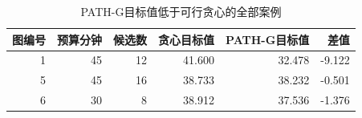 \begin{table}[htbp]\centering\caption{PATH-G目标值低于可行贪心的全部案例}\begin{tabular}{rrrrrr}\toprule 图编号&预算分钟&候选数&贪心目标值&PATH-G目标值&差值\\\midrule
1&45&12&41.600&32.478&-9.122\\
5&45&16&38.733&38.232&-0.501\\
6&30&8&38.912&37.536&-1.376\\
\bottomrule\end{tabular}\end{table}